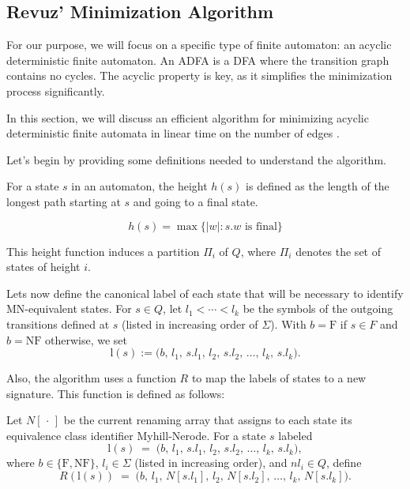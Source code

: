 \subsection{Revuz' Minimization Algorithm} \label{sec:revuz}
For our purpose, we will focus on a specific type of finite automaton: an acyclic deterministic finite automaton. An ADFA is a DFA where the transition graph contains no cycles. The acyclic property is key, as it simplifies the minimization process significantly. 

In this section, we will discuss an efficient algorithm for minimizing acyclic deterministic finite automata in linear time on the number of edges \cite{revuz1992minimisation}.

Let's begin by providing some definitions needed to understand the algorithm.

\begin{definition} \label{def:height}
    For a state $s$ in an automaton, the height $h(s)$ is defined as the length of the longest path starting at $s$ and going to a final state. 

    $$h(s) = \max\{|w|:s.w \text{ is final}\}$$
\end{definition}

This height function induces a partition $\Pi_i$ of $Q$, where $\Pi_i$ denotes the set of states of height $i$.

\begin{comment}
\begin{definition}[Distinguished set]
    We say that a set $\Pi_i$ is distinguished if no pair of states in $\Pi_i$ are MN-equivalent.
\end{definition}
\end{comment}

Lets now define the canonical label of each state that will be necessary to identify MN-equivalent states. For $s\in Q$, let $l_1<\cdots<l_k$ be the symbols of the outgoing transitions defined at $s$ (listed in increasing order of $\Sigma$). With $b=\text{F}$ if $s\in F$ and $b=\text{NF}$ otherwise, we set
\[
\mathrm{l}(s) := \big(b,\, l_1,\, s.l_1,\, l_2,\, s.l_2,\, \dots,\, l_k,\, s.l_k\big).
\]

Also, the algorithm uses a function $R$ to map the labels of states to a new signature. This function is defined as follows:
\begin{definition} \label{def:R}
Let $N[\,\cdot\,]$ be the current renaming array that assigns to each state its equivalence class identifier Myhill-Nerode.  
For a state $s$ labeled
\[
\mathrm{l}(s) \;=\; \big(b,\, l_1,\, s.l_1,\, l_2,\, s.l_2,\, \dots,\, l_k,\, s.l_k\big),
\]
where $b \in \{\text{F},\text{NF}\}$, $l_i \in \Sigma$ (listed in increasing order), and $nl_i \in Q$, define
\[
R\!\left(\mathrm{l}(s)\right) \;=\; \big(b,\, l_1,\, N[s.l_1],\, l_2,\, N[s.l_2],\, \dots,\, l_k,\, N[s.l_k]\big).
\]
\end{definition}

